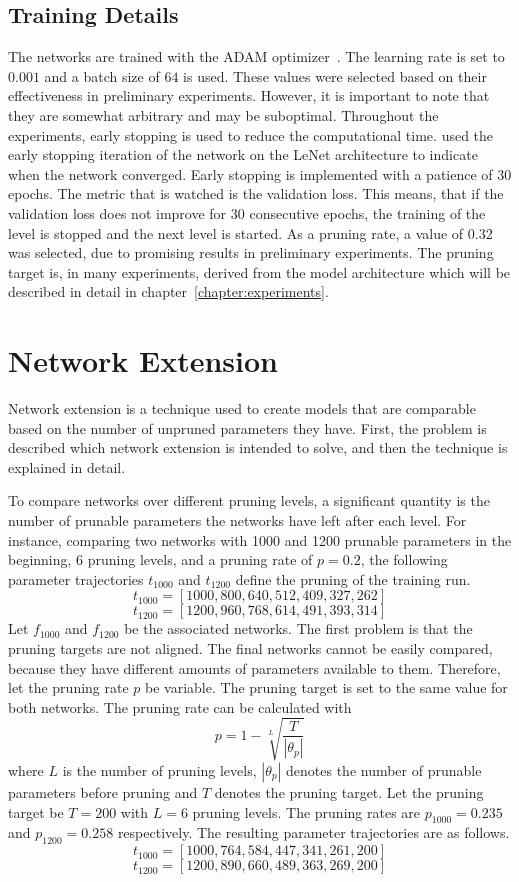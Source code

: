 \subsection{Training Details}
The networks are trained with the ADAM optimizer~\autocite{ADAM}.
The learning rate is set to $0.001$ and a batch size of $64$ is used.
These values were selected based on their effectiveness in preliminary experiments. 
However, it is important to note that they are somewhat arbitrary and may be suboptimal.
Throughout the experiments, early stopping is used to reduce the computational time.
\textcite{LTH} used the early stopping iteration of the network on the LeNet architecture to indicate when the network converged.
Early stopping is implemented with a patience of $30$ epochs.
The metric that is watched is the validation loss.
This means, that if the validation loss does not improve for $30$ consecutive epochs, the training of the level is stopped and the next level is started.
As a pruning rate, a value of $0.32$ was selected, due to promising results in preliminary experiments.
The pruning target is, in many experiments, derived from the model architecture which will be described in detail in chapter~\ref{chapter:experiments}.

\section{Network Extension}\label{sec:extension}
Network extension is a technique used to create models that are comparable based on the number of unpruned parameters they have. 
First, the problem is described which network extension is intended to solve, and then the technique is explained in detail.

To compare networks over different pruning levels, a significant quantity is the number of prunable parameters the networks have left after each level.
For instance, comparing two networks with 1000 and 1200 prunable parameters in the beginning, 6 pruning levels, and a pruning rate of $p=0.2$, the following parameter trajectories $t_{1000}$ and $t_{1200}$ define the pruning of the training run.
\[ t_{1000} = [1000, 800, 640, 512, 409, 327, 262] \]
\[ t_{1200} = [1200, 960, 768, 614, 491, 393, 314] \]
Let $f_{1000}$ and $f_{1200}$ be the associated networks.
The first problem is that the pruning targets are not aligned.
The final networks cannot be easily compared, because they have different amounts of parameters available to them.
Therefore, let the pruning rate $p$ be variable.
The pruning target is set to the same value for both networks.
The pruning rate can be calculated with 
\[ p = 1 - \sqrt[L]{\frac{T}{|\theta_p|}} \]
where $L$ is the number of pruning levels, $|\theta_p|$ denotes the number of prunable parameters before pruning and $T$ denotes the pruning target.
Let the pruning target be $T=200$ with $L=6$ pruning levels.
The pruning rates are $p_{1000} = 0.235$ and $p_{1200} = 0.258$ respectively.
The resulting parameter trajectories are as follows.
\[ t_{1000} = [1000, 764, 584, 447, 341, 261, 200] \]
\[ t_{1200} = [1200, 890, 660, 489, 363, 269, 200] \]


